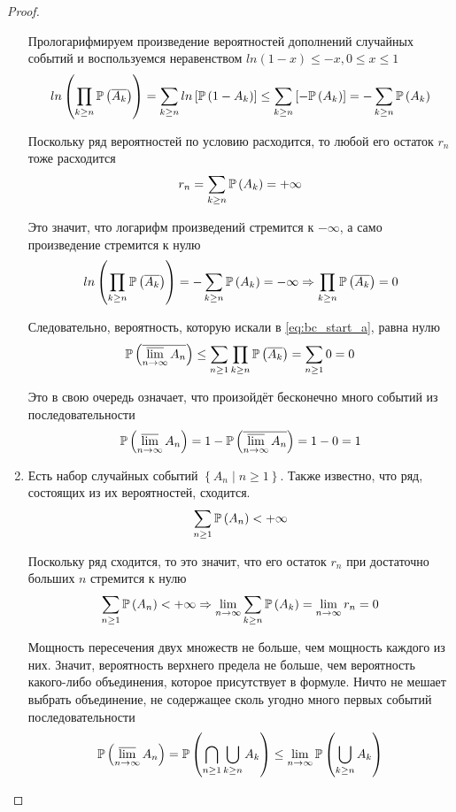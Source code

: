 \begin{proof}
\begin{enumerate}[label=\alph*]
        Прологарифмируем произведение вероятностей дополнений случайных событий
        и воспользуемся неравенством $ln\left(1-x\right)\le -x,0\le x\le 1$
        \cite[стр.~327]{Shiryayev1}
        $$ln\left(\prod_{k\ge n}\mathbb{P}\left( \overline{A_k} \right)\right)
            =\sum_{k\ge n}ln\left[\mathbb{P}\left( 1-A_k \right)\right]
            \le\sum_{k\ge n}\left[-\mathbb{P}\left( A_k \right)\right]
            =-\sum_{k\ge n}\mathbb{P}\left( A_k \right)$$

        Поскольку ряд вероятностей по условию расходится,
        то любой его остаток $r_n$ тоже расходится
        $$r_n=\sum_{k\ge n}\mathbb{P}\left( A_k \right)=+\infty$$

        Это значит, что логарифм произведений стремится к $-\infty$,
        а само произведение стремится к нулю
        \begin{align*}
            ln\left(\prod_{k\ge n}\mathbb{P}\left( \overline{A_k} \right)\right)
                =-\sum_{k\ge n}\mathbb{P}\left( A_k \right)=-\infty
                \Rightarrow\prod_{k\ge n}\mathbb{P}\left( \overline{A_k} \right)=0
        \end{align*}

        Следовательно, вероятность, которую искали в  \eqref{eq:bc_start_a},
        равна нулю
        $$\mathbb{P}\left( \overline{\varlimsup_{n\to\infty}A_n} \right)
            \le \sum_{n\ge 1}\prod_{k\ge n}\mathbb{P}\left( \overline{A_k} \right)
            =\sum_{n\ge 1} 0
            =0$$

        Это в свою очередь означает, что произойдёт бесконечно много событий
        из последовательности
        $$\mathbb{P}\left( \varlimsup_{n\to\infty}A_n \right)
            =1-\mathbb{P}\left( \overline{\varlimsup_{n\to\infty}A_n} \right)
            =1-0=1$$

    \item Есть набор случайных событий $\left\{ A_n\mid n\ge1 \right\}$.
        Также известно, что ряд, состоящих из их вероятностей, сходится.
        $$\sum_{n\ge 1}\mathbb{P}\left( A_n \right) < +\infty$$

        Поскольку ряд сходится, то это значит, что его остаток $r_n$
        при достаточно больших $n$ стремится к нулю\cite[стр.~430]{IlinMA1}
        $$\sum_{n\ge 1}\mathbb{P}\left( A_n \right) < +\infty
        \Rightarrow\lim\limits_{n\to\infty}\sum_{k\ge n}\mathbb{P}\left( A_k \right)
            =\lim\limits_{n\to\infty}r_n=0$$

        Мощность пересечения двух множеств не больше,
        чем мощность каждого из них.
        Значит, вероятность верхнего предела не больше,
        чем вероятность какого-либо объединения, которое присутствует в формуле.
        Ничто не мешает выбрать объединение,
        не содержащее сколь угодно много первых событий последовательности
        \cite[стр.~327]{Shiryayev1}
        $$\mathbb{P}\left( \varlimsup\limits_{n\to\infty} A_n \right)
            =\mathbb{P}\left( \bigcap_{n\ge 1}\bigcup_{k\ge n} A_k \right)
            \le\lim\limits_{n\to\infty}\mathbb{P}\left( \bigcup_{k\ge n} A_k \right)$$


\end{enumerate}
\end{proof}
